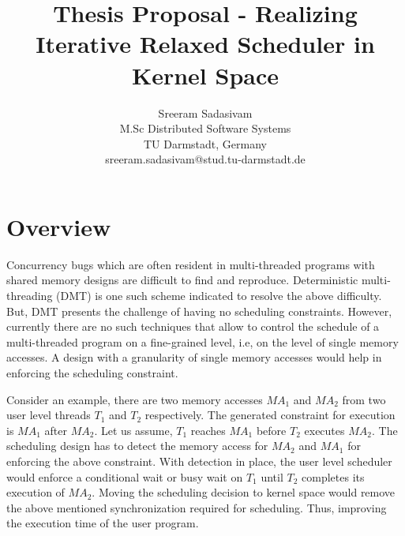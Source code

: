 \documentclass[12pt]{article}
\begin{document}
\title{\vspace{-3.5cm} Thesis Proposal - Realizing Iterative Relaxed Scheduler in Kernel Space}


\author{
		 Sreeram Sadasivam\\
		M.Sc Distributed Software Systems\\
		TU Darmstadt, Germany\\
		sreeram.sadasivam@stud.tu-darmstadt.de
}

\date{}


\maketitle




\section*{Overview}

Concurrency bugs which are often resident in multi-threaded programs with shared memory designs are difficult to find and reproduce. 
Deterministic multi-threading (DMT) is one such scheme indicated to resolve the above difficulty. 
But, DMT presents the challenge of having no scheduling constraints.  
However, currently there are no such techniques that allow to control the schedule of a multi-threaded program on a fine-grained level, i.e, on the level of single memory accesses. 
A design with a granularity of single memory accesses would help in enforcing the scheduling constraint. 

Consider an example, there are two memory accesses $MA_{1}$ and $MA_{2}$ from two user level threads $T_{1}$ and $T_{2}$ respectively. 
The generated constraint for execution is $MA_{1}$ after $MA_{2}$. 
Let us assume, $T_{1}$ reaches $MA_{1}$ before $T_{2}$ executes $MA_{2}$. 
The scheduling design has to detect the memory access for $MA_{2}$ and $MA_{1}$ for enforcing the above constraint. 
With detection in place, the user level scheduler would enforce a conditional wait or busy wait on $T_{1}$ until $T_{2}$ completes its execution of $MA_{2}$.  
Moving the scheduling decision to kernel space would remove the above mentioned synchronization required for scheduling. 
Thus, improving the execution time of the user program.
\end{document}
